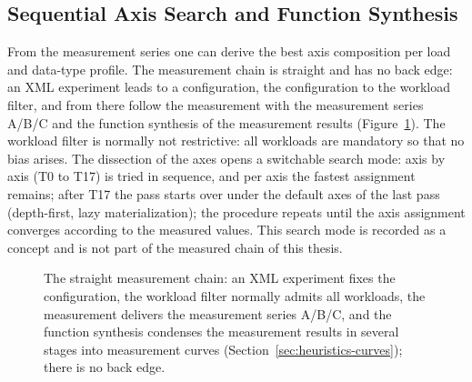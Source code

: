 \begin{nurlang}
\subsection{Sequential Axis Search and Function Synthesis}\label{sec:heuristics-loop}
From the measurement series one can derive the best axis composition per load and
data-type profile.
The measurement chain is straight and has no back edge: an XML experiment leads to a configuration, the
configuration to the workload filter, and from there follow the measurement with the measurement series A/B/C
and the function synthesis of the measurement results (Figure~\ref{fig:mess-kette}). The workload filter is
normally not restrictive: all workloads are mandatory so that no bias arises. The dissection of the axes
opens a switchable search mode: axis by axis (T0 to T17) is tried in sequence, and per axis the fastest
assignment remains; after T17 the pass starts over under the default axes of the last pass (depth-first,
lazy materialization); the procedure repeats until the axis assignment converges according to the measured values.
This search mode is recorded as a concept
and is not part of the measured chain of this thesis.
\begin{figure}[htbp]\centering
{}
\caption{The straight measurement chain: an XML experiment fixes the configuration, the workload filter normally admits all workloads, the measurement delivers the measurement series A/B/C, and the function synthesis condenses the measurement results in several stages into measurement curves (Section~\ref{sec:heuristics-curves}); there is no back edge.}\label{fig:mess-kette}
\end{figure}


\end{nurlang}
